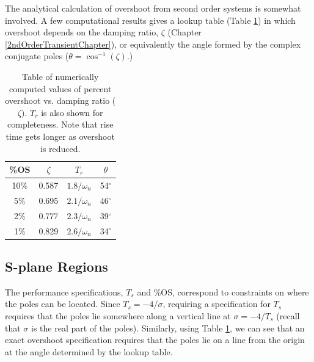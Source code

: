 The analytical calculation of overshoot from second order systems is somewhat involved.  A few computational results gives a lookup table (Table \ref{percentOStable}) in which overshoot depends on the damping ratio, $\zeta$ (Chapter \ref{2ndOrderTransientChapter}), or 
equivalently the angle formed by the complex conjugate poles ($\theta = \cos^{-1}(\zeta)$.)

\begin{table}[h]\centering
\begin{tabular}{c|c|c|c}
	\%OS	& $\zeta$	& $T_r$          &   $\theta$	\\\hline
	10\%	& 0.587		& $1.8/\omega_n$ &  54$^\circ$	\\
	 5\%	& 0.695		& $2.1/\omega_n$ &  46$^\circ$	\\
	 2\%	& 0.777		& $2.3/\omega_n$ &  39$^\circ$	\\
	 1\%	& 0.829		& $2.6/\omega_n$ &  34$^\circ$	\\
\end{tabular}
\caption{Table of numerically computed values of percent overshoot vs. damping ratio ($\zeta)$.    $T_r$ is also shown for
completeness. Note that rise time gets longer as overshoot is reduced.}\label{percentOStable}
\end{table}

\subsection{S-plane Regions}

The performance specifications, $T_s$ and \%OS,  correspond to constraints on where the poles can be located.
Since  $T_s = -4/\sigma$, requiring a  specification for $T_s$ requires that the poles lie somewhere along a vertical line at $\sigma = -4/T_s$ (recall that $\sigma$ is the real part of the poles).  Similarly, using  Table \ref{percentOStable}, we can see that an exact overshoot specification requires that the poles lie on a line from the origin at the angle determined by the lookup table.


